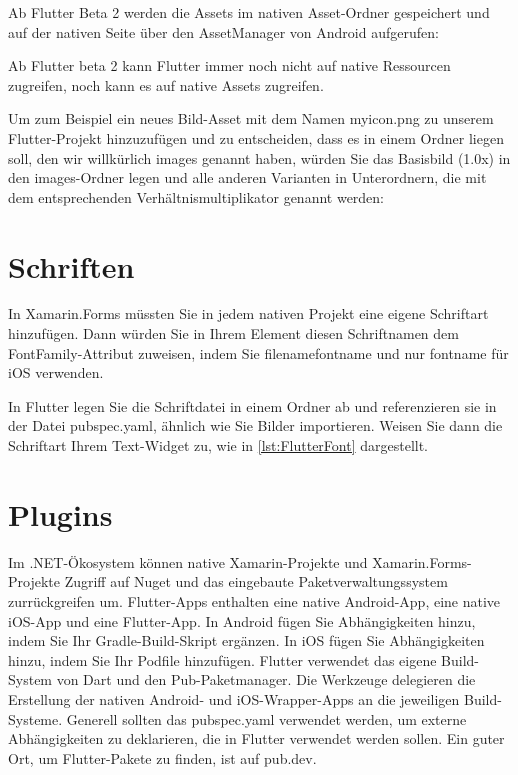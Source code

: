Ab Flutter Beta 2 werden die Assets im nativen Asset-Ordner gespeichert und auf der nativen Seite über den AssetManager von Android aufgerufen:

Ab Flutter beta 2 kann Flutter immer noch nicht auf native Ressourcen zugreifen, noch kann es auf native Assets zugreifen.

Um zum Beispiel ein neues Bild-Asset mit dem Namen myicon.png zu unserem Flutter-Projekt hinzuzufügen und zu entscheiden, dass es in einem Ordner liegen soll, den wir willkürlich images genannt haben, würden Sie das Basisbild (1.0x) in den images-Ordner legen und alle anderen Varianten in Unterordnern, die mit dem entsprechenden Verhältnismultiplikator genannt werden:
\section{Schriften}
In Xamarin.Forms müssten Sie in jedem nativen Projekt eine eigene Schriftart hinzufügen. Dann würden Sie in Ihrem Element diesen Schriftnamen dem FontFamily-Attribut zuweisen, indem Sie filenamefontname und nur fontname für iOS verwenden.

In Flutter legen Sie die Schriftdatei in einem Ordner ab und referenzieren sie in der Datei pubspec.yaml, ähnlich wie Sie Bilder importieren.
Weisen Sie dann die Schriftart Ihrem Text-Widget zu, wie in  \ref{lst:FlutterFont} dargestellt. 

\begin{minipage}{\linewidth}

\end{minipage}

\section{Plugins}
Im .NET-Ökosystem können native Xamarin-Projekte und Xamarin.Forms-Projekte Zugriff auf Nuget und das eingebaute Paketverwaltungssystem zurrückgreifen um.  Flutter-Apps enthalten eine native Android-App, eine native iOS-App und eine Flutter-App.
In Android fügen Sie Abhängigkeiten hinzu, indem Sie Ihr Gradle-Build-Skript ergänzen. In iOS fügen Sie Abhängigkeiten hinzu, indem Sie Ihr Podfile hinzufügen.
Flutter verwendet das eigene Build-System von Dart und den Pub-Paketmanager. Die Werkzeuge delegieren die Erstellung der nativen Android- und iOS-Wrapper-Apps an die jeweiligen Build-Systeme.
Generell sollten das pubspec.yaml verwendet werden, um externe Abhängigkeiten zu deklarieren, die in Flutter verwendet werden sollen. Ein guter Ort, um Flutter-Pakete zu finden, ist auf pub.dev.

